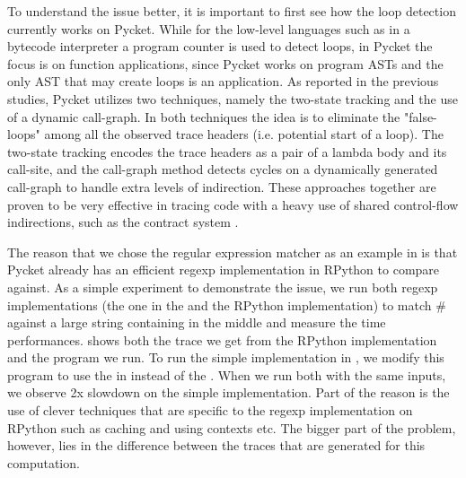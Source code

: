 
To understand the issue better, it is important to first see how the
loop detection currently works on Pycket. While for the low-level
languages such as in a bytecode interpreter a program counter is used
to detect loops, in Pycket the focus is on function applications,
since Pycket works on program ASTs and the only AST that may create
loops is an application. As reported in the previous studies, Pycket
utilizes two techniques, namely the two-state tracking and the use of
a dynamic call-graph. In both techniques the idea is to eliminate the
"false-loops" among all the observed trace headers (i.e. potential
start of a loop). The two-state tracking encodes the trace headers as
a pair of a lambda body and its call-site, and the call-graph method
detects cycles on a dynamically generated call-graph to handle extra
levels of indirection. These approaches together are proven to be very
effective in tracing code with a heavy use of shared control-flow
indirections, such as the contract system \cite{pycket15,pycket17}.

The reason that we chose the regular expression matcher as an example
in  is that Pycket already has an efficient regexp
implementation in RPython to compare against. As a simple experiment
to demonstrate the issue, we run both regexp implementations (the one
in the  and the RPython implementation) to match
$\mathtt{\#}$ against a large string containing
 in the middle and measure the time
performances.  shows both the trace we get
from the RPython implementation and the program we run. To run the
simple implementation in , we modify this program
to use the  in instead of the
. When we run both with the same inputs, we
observe 2x slowdown on the simple implementation. Part of the reason
is the use of clever techniques that are specific to the regexp
implementation on RPython such as caching and using contexts etc. The
bigger part of the problem, however, lies in the difference between
the traces that are generated for this computation.

